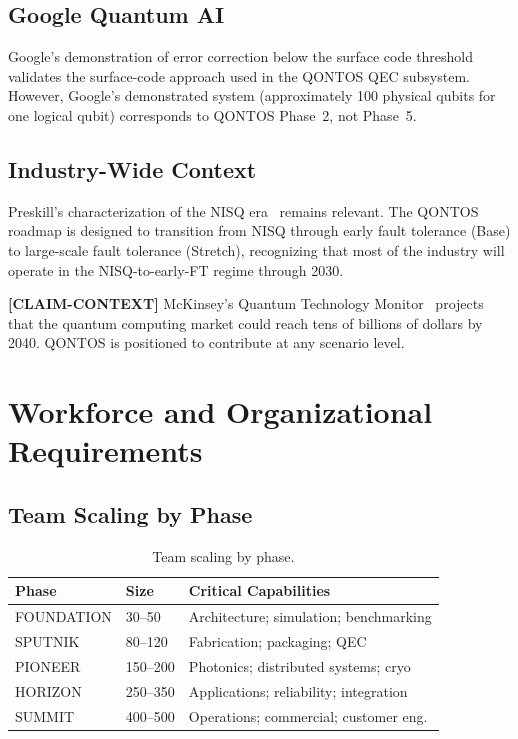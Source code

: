 \documentclass[conference]{IEEEtran}
\begin{document}
\subsection{Google Quantum AI}

Google's demonstration of error correction below the surface code threshold~\cite{google2024} validates the surface-code approach used in the QONTOS QEC subsystem. However, Google's demonstrated system (approximately 100 physical qubits for one logical qubit) corresponds to QONTOS Phase~2, not Phase~5.

\subsection{Industry-Wide Context}

Preskill's characterization of the NISQ era~\cite{preskill2018} remains relevant. The QONTOS roadmap is designed to transition from NISQ through early fault tolerance (Base) to large-scale fault tolerance (Stretch), recognizing that most of the industry will operate in the NISQ-to-early-FT regime through 2030.

\textbf{[CLAIM-CONTEXT]} McKinsey's Quantum Technology Monitor~\cite{mckinsey2024} projects that the quantum computing market could reach tens of billions of dollars by 2040. QONTOS is positioned to contribute at any scenario level.

\section{Workforce and Organizational Requirements}

\subsection{Team Scaling by Phase}

\begin{table}[H]
\centering
\caption{Team scaling by phase.}
\label{tab:team_scaling}
\begin{tabular}{@{}l l L{4cm}@{}}
\toprule
\textbf{Phase} & \textbf{Size} & \textbf{Critical Capabilities} \\
\midrule
FOUNDATION & 30--50 & Architecture; simulation; benchmarking \\
SPUTNIK & 80--120 & Fabrication; packaging; QEC \\
PIONEER & 150--200 & Photonics; distributed systems; cryo \\
HORIZON & 250--350 & Applications; reliability; integration \\
SUMMIT & 400--500 & Operations; commercial; customer eng. \\
\bottomrule
\end{tabular}
\end{table}
\end{document}
